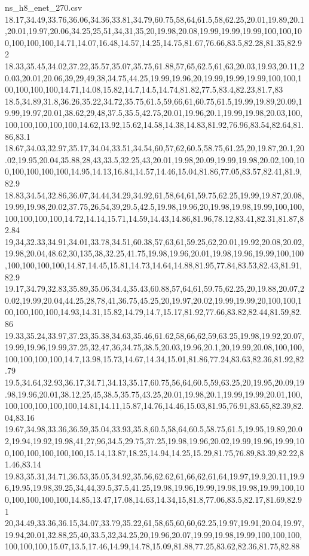 \begin{filecontents*}[overwrite]{ns_h8_enet_270.csv}
18.17,34.49,33.76,36.06,34.36,33.81,34.79,60.75,58,64,61.5,58,62.25,20.01,19.89,20.1,20.01,19.97,20.06,34.25,25,51,34,31,35,20,19.98,20.08,19.99,19.99,19.99,100,100,100,100,100,100,14.71,14.07,16.48,14.57,14.25,14.75,81.67,76.66,83.5,82.28,81.35,82.92
18.33,35.45,34.02,37.22,35.57,35.07,35.75,61.88,57,65,62.5,61,63,20.03,19.93,20.11,20.03,20.01,20.06,39,29,49,38,34.75,44.25,19.99,19.96,20,19.99,19.99,19.99,100,100,100,100,100,100,14.71,14.08,15.82,14.7,14.5,14.74,81.82,77.5,83.4,82.23,81.7,83
18.5,34.89,31.8,36.26,35.22,34.72,35.75,61.5,59,66,61,60.75,61.5,19.99,19.89,20.09,19.99,19.97,20.01,38.62,29,48,37.5,35.5,42.75,20.01,19.96,20.1,19.99,19.98,20.03,100,100,100,100,100,100,14.62,13.92,15.62,14.58,14.38,14.83,81.92,76.96,83.54,82.64,81.86,83.1
18.67,34.03,32.97,35.17,34.04,33.51,34.54,60,57,62,60.5,58.75,61.25,20,19.87,20.1,20.02,19.95,20.04,35.88,28,43,33.5,32.25,43,20.01,19.98,20.09,19.99,19.98,20.02,100,100,100,100,100,100,14.95,14.13,16.84,14.57,14.46,15.04,81.86,77.05,83.57,82.41,81.9,82.9
18.83,34.54,32.86,36.07,34.44,34.29,34.92,61,58,64,61,59.75,62.25,19.99,19.87,20.08,19.99,19.98,20.02,37.75,26,54,39,29.5,42.5,19.98,19.96,20,19.98,19.98,19.99,100,100,100,100,100,100,14.72,14.14,15.71,14.59,14.43,14.86,81.96,78.12,83.41,82.31,81.87,82.84
19,34,32.33,34.91,34.01,33.78,34.51,60.38,57,63,61,59.25,62,20.01,19.92,20.08,20.02,19.98,20.04,48.62,30,135,38,32.25,41.75,19.98,19.96,20.01,19.98,19.96,19.99,100,100,100,100,100,100,14.87,14.45,15.81,14.73,14.64,14.88,81.95,77.84,83.53,82.43,81.91,82.9
19.17,34.79,32.83,35.89,35.06,34.4,35.43,60.88,57,64,61,59.75,62.25,20,19.88,20.07,20.02,19.99,20.04,44.25,28,78,41,36.75,45.25,20,19.97,20.02,19.99,19.99,20,100,100,100,100,100,100,14.93,14.31,15.82,14.79,14.7,15.17,81.92,77.66,83.82,82.44,81.59,82.86
19.33,35.24,33.97,37.23,35.38,34.63,35.46,61.62,58,66,62,59,63.25,19.98,19.92,20.07,19.99,19.96,19.99,37.25,32,47,36,34.75,38.5,20.03,19.96,20.1,20,19.99,20.08,100,100,100,100,100,100,14.7,13.98,15.73,14.67,14.34,15.01,81.86,77.24,83.63,82.36,81.92,82.79
19.5,34.64,32.93,36.17,34.71,34.13,35.17,60.75,56,64,60.5,59,63.25,20,19.95,20.09,19.98,19.96,20.01,38.12,25,45,38.5,35.75,43.25,20.01,19.98,20.1,19.99,19.99,20.01,100,100,100,100,100,100,14.81,14.11,15.87,14.76,14.46,15.03,81.95,76.91,83.65,82.39,82.04,83.16
19.67,34.98,33.36,36.59,35.04,33.93,35.8,60.5,58,64,60.5,58.75,61.5,19.95,19.89,20.02,19.94,19.92,19.98,41,27,96,34.5,29.75,37.25,19.98,19.96,20.02,19.99,19.96,19.99,100,100,100,100,100,100,15.14,13.87,18.25,14.94,14.25,15.29,81.75,76.89,83.39,82.22,81.46,83.14
19.83,35.31,34.71,36.53,35.05,34.92,35.56,62.62,61,66,62,61,64,19.97,19.9,20.11,19.96,19.95,19.98,39.25,34,44,39.5,37.5,41.25,19.98,19.96,19.99,19.98,19.98,19.99,100,100,100,100,100,100,14.85,13.47,17.08,14.63,14.34,15,81.8,77.06,83.5,82.17,81.69,82.91
20,34.49,33.36,36.15,34.07,33.79,35.22,61,58,65,60,60,62.25,19.97,19.91,20.04,19.97,19.94,20.01,32.88,25,40,33.5,32,34.25,20,19.96,20.07,19.99,19.98,19.99,100,100,100,100,100,100,15.07,13.5,17.46,14.99,14.78,15.09,81.88,77.25,83.62,82.36,81.75,82.88
\end{filecontents*}

